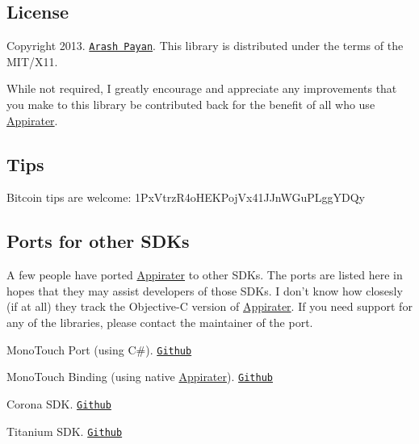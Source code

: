 \subsection*{License }

Copyright 2013. \href{http://arashpayan.com}{\tt Arash Payan}. This library is distributed under the terms of the M\-I\-T/\-X11.

While not required, I greatly encourage and appreciate any improvements that you make to this library be contributed back for the benefit of all who use \hyperlink{interface_appirater}{Appirater}.

\subsection*{Tips }

Bitcoin tips are welcome\-: 1\-Px\-Vtrz\-R4o\-H\-E\-K\-Poj\-Vx41\-J\-Jn\-W\-Gu\-P\-Lgg\-Y\-D\-Qy

\subsection*{Ports for other S\-D\-Ks }

A few people have ported \hyperlink{interface_appirater}{Appirater} to other S\-D\-Ks. The ports are listed here in hopes that they may assist developers of those S\-D\-Ks. I don't know how closesly (if at all) they track the Objective-\/\-C version of \hyperlink{interface_appirater}{Appirater}. If you need support for any of the libraries, please contact the maintainer of the port.


\begin{DoxyItemize}
\item Mono\-Touch Port (using C\#). \href{https://github.com/chebum/Appirater-for-MonoTouch}{\tt Github}
\item Mono\-Touch Binding (using native \hyperlink{interface_appirater}{Appirater}). \href{https://github.com/theonlylawislove/MonoTouch.Appirater}{\tt Github}
\item Corona S\-D\-K. \href{https://github.com/aliasgar84/Appirater}{\tt Github}
\item Titanium S\-D\-K. \href{https://github.com/mpociot/TiAppirater}{\tt Github} 
\end{DoxyItemize}